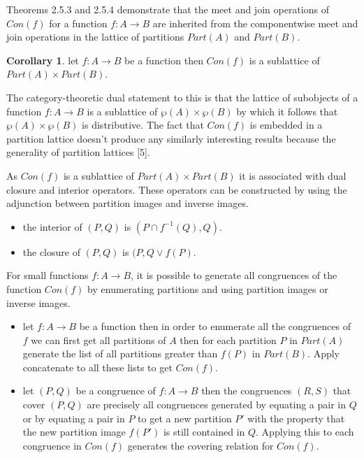 \documentclass[a4paper,11pt, notitlepage]{report}
\theoremstyle{definition}
\newtheorem{corollary}{Corollary}[section]
\begin{document}
Theorems 2.5.3 and 2.5.4 demonstrate that the meet and join operations of $Con(f)$ for a function $f:A \to B$ are inherited from the componentwise meet and join operations in the lattice of partitions $Part(A)$ and $Part(B)$.

\begin{corollary}
let $f: A \to B$ be a function then $Con(f)$ is a sublattice of $Part(A) \times Part(B)$.
\end{corollary}

The category-theoretic dual statement to this is that the lattice of subobjects of a function $f: A \to B$ is a sublattice of $\wp(A) \times \wp(B)$ by which it follows that $\wp(A) \times \wp(B)$ is distributive. The fact that $Con(f)$ is embedded in a partition lattice doesn't produce any similarly interesting results because the generality of partition lattices [5].

As $Con(f)$ is a sublattice of $Part(A) \times Part(B)$ it is associated with dual closure and interior operators. These operators can be constructed by using the adjunction between partition images and inverse images.

\begin{itemize}
 \item the interior of $(P,Q)$ is $(P \cap f^{-1}(Q),Q)$.
 \item the closure of $(P,Q)$ is $(P, Q \vee f(P)$.
\end{itemize}

For small functions $f: A \to B$, it is possible to generate all congruences of the function $Con(f)$ by enumerating partitions and using partition images or inverse images.

\begin{itemize}
 \item let $f : A \to B$ be a function then in order to enumerate all the congruences of $f$ we can first get all partitions of $A$ then for each partition $P$ in $Part(A)$ generate the list of all partitions greater than $f(P)$ in $Part(B)$. Apply concatenate to all these lists to get $Con(f)$.
 \item let $(P,Q)$ be a congruence of $f: A \to B$ then the congruences $(R,S)$ that cover $(P,Q)$ are precisely all congruences generated by equating a pair in $Q$ or by equating a pair in $P$ to get a new partition $P'$ with the property that the new partition image $f(P')$ is still contained in $Q$. Applying this to each congruence in $Con(f)$ generates the covering relation for $Con(f)$.
\end{itemize}
\end{document}

